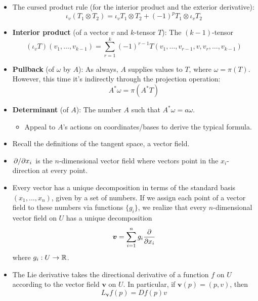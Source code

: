 \documentclass[../notes.tex]{subfiles}
\begin{document}
\begin{itemize}
    \item The cursed product rule (for the interior product and the exterior derivative):
    \begin{equation*}
        \iota_v(T_1\otimes T_2) = \iota_vT_1\otimes T_2+(-1)^pT_1\otimes\iota_vT_2
    \end{equation*}
    \item \textbf{Interior product} (of a vector $v$ and $k$-tensor $T$): The $(k-1)$-tensor
    \begin{equation*}
        (\iota_vT)(v_1,\dots,v_{k-1}) = \sum_{r=1}^k(-1)^{r-1}T(v_1,\dots,v_{r-1},v,v_r,\dots,v_{k-1})
    \end{equation*}
    \item \textbf{Pullback} (of $\omega$ by $A$): As always, $A$ supplies values to $T$, where $\omega=\pi(T)$. However, this time it's indirectly through the projection operation:
    \begin{equation*}
        A^*\omega = \pi(A^*T)
    \end{equation*}
    \item \textbf{Determinant} (of $A$): The number $A$ such that $A^*\omega=a\omega$.
    \begin{itemize}
        \item Appeal to $A$'s actions on coordinates/bases to derive the typical formula.
    \end{itemize}
    \item Recall the definitions of the tangent space, a vector field.
    \item $\pdv*{x_i}$ is the $n$-dimensional vector field where vectors point in the $x_i$-direction at every point.
    \item Every vector has a unique decomposition in terms of the standard basis $(x_1,\dots,x_n)$, given by a set of numbers. If we assign each point of a vector field to these numbers via functions $\{g_i\}$, we realize that every $n$-dimensional vector field on $U$ has a unique decomposition
    \begin{equation*}
        \bm{v} = \sum_{i=1}^ng_i\pdv{x_i}
    \end{equation*}
    where $g_i:U\to\mathbb{R}$.
    \item The Lie derivative takes the directional derivative of a function $f$ on $U$ according to the vector field $\bm{v}$ on $U$. In particular, if $\bm{v}(p)=(p,v)$, then
    \begin{equation*}
        L_{\bm{v}}f(p) = Df(p)v
    \end{equation*}

\end{itemize}
\end{document}
